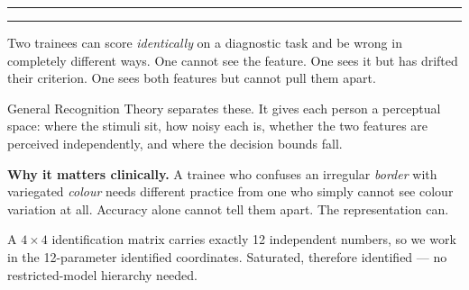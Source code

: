 \documentclass[final]{article}
\newlength{\colw}
\begin{document}
\vspace{0.1in}
{\color{gink}\rule{\textwidth}{6pt}}
\vspace{0.5in}

\noindent

\vspace{0.24in}
{\color{gmute}\rule{\textwidth}{2pt}}
\vspace{0.16in}

\noindent
\begin{minipage}[t]{\colw}

{\bodyfont
Two trainees can score \emph{identically} on a diagnostic task and be wrong in
completely different ways. One cannot see the feature. One sees it but has
drifted their criterion. One sees both features but cannot pull them apart.

General Recognition Theory separates these. It gives each person a perceptual
space: where the stimuli sit, how noisy each is, whether the two features are
perceived independently, and where the decision bounds fall.
\par}

\begin{callout}
\textbf{Why it matters clinically.} A trainee who confuses an irregular
\emph{border} with variegated \emph{colour} needs different practice from one
who simply cannot see colour variation at all. Accuracy alone cannot tell them
apart. The representation can.
\end{callout}

{\bodyfont
A $4\times4$ identification matrix carries exactly 12 independent numbers, so
we work in the 12-parameter identified coordinates. Saturated, therefore
identified --- no restricted-model hierarchy needed.
\par}
\end{minipage}%
\hfill
\end{document}
